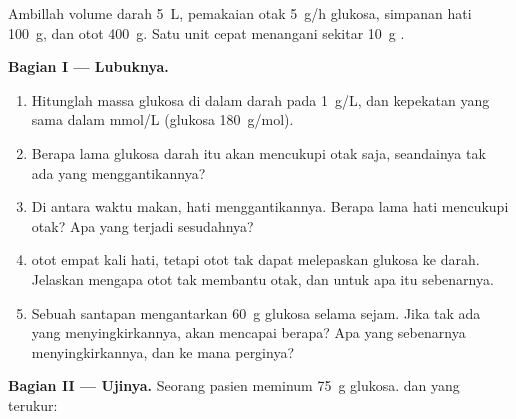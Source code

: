 \begin{problem}
\label{pb:g12:glucose-and-diabetes:1}
Ambillah volume darah \qty{5}{L}, pemakaian otak \qty{5}{g/h} glukosa,
simpanan  hati \qty{100}{g}, dan  otot \qty{400}{g}.
Satu unit  cepat menangani sekitar \qty{10}{g} .

\medskip
\noindent\textbf{Bagian I --- Lubuknya.}
\begin{enumerate}
  \item Hitunglah massa glukosa di dalam darah pada \qty{1}{g/L}, dan
        kepekatan yang sama dalam \unit{mmol/L} (glukosa
        \qty{180}{g/mol}).
  \item Berapa lama glukosa darah itu akan mencukupi otak saja,
        seandainya tak ada yang menggantikannya?
  \item Di antara waktu makan, hati menggantikannya. Berapa lama
         hati mencukupi otak? Apa yang terjadi sesudahnya?
  \item {} otot empat kali  hati, tetapi otot tak dapat
        melepaskan glukosa ke darah. Jelaskan mengapa  otot tak
        membantu otak, dan untuk apa  itu sebenarnya.
  \item Sebuah santapan mengantarkan \qty{60}{g} glukosa selama sejam.
        Jika tak ada yang menyingkirkannya,  akan mencapai
        berapa? Apa yang sebenarnya menyingkirkannya, dan ke mana
        perginya?
\end{enumerate}

\medskip
\noindent\textbf{Bagian II --- Ujinya.}
Seorang pasien meminum \qty{75}{g} glukosa.  dan  yang
terukur:


\end{problem}
